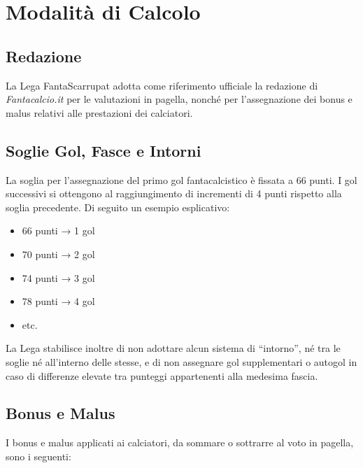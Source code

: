 \chapter{Modalità di Calcolo}
\label{cap:modalita-calcolo}

\section{Redazione}
\label{art:5.1}

La Lega FantaScarrupat adotta come riferimento ufficiale la redazione di \emph{Fantacalcio.it} per le valutazioni in pagella, nonché per l'assegnazione dei bonus e malus relativi alle prestazioni dei calciatori.

\section{Soglie Gol, Fasce e Intorni}
\label{art:5.2}

La soglia per l'assegnazione del primo gol fantacalcistico è fissata a 66 punti. I gol successivi si ottengono al raggiungimento di incrementi di 4 punti rispetto alla soglia precedente. Di seguito un esempio esplicativo:

\begin{itemize}
    \item 66 punti → 1 gol
    \item 70 punti → 2 gol
    \item 74 punti → 3 gol
    \item 78 punti → 4 gol
    \item etc.
\end{itemize}

La Lega stabilisce inoltre di non adottare alcun sistema di “intorno”, né tra le soglie né all'interno delle stesse, e di non assegnare gol supplementari o autogol in caso di differenze elevate tra punteggi appartenenti alla medesima fascia.

\section{Bonus e Malus}
\label{art:5.3}

I bonus e malus applicati ai calciatori, da sommare o sottrarre al voto in pagella, sono i seguenti:

